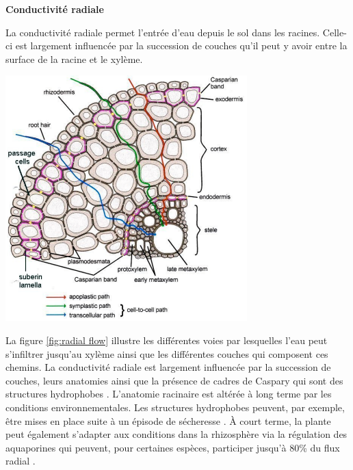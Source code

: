 \noindent \textbf{Conductivité radiale}

La conductivité radiale permet l'entrée d'eau depuis le sol dans les racines.
Celle-ci est largement influencée par la succession de couches qu'il peut y avoir entre la surface de la racine et le xylème.

\begin{minipage}{0.55\linewidth}
\captionsetup{type=figure,hypcap=true}
\centering
\includegraphics[width=\linewidth]{Image/radial flow.png}
\label{fig:radial flow}
\end{minipage}\hfill
\begin{minipage}{0.4\linewidth}
La figure \ref{fig:radial flow} illustre les différentes voies par lesquelles l'eau peut s'infiltrer jusqu'au xylème ainsi que les différentes couches qui composent ces chemins.
La conductivité radiale est largement influencée par la succession de couches, leurs anatomies ainsi que la présence de cadres de Caspary qui sont des structures hydrophobes \citep{yang_drought-induced_2012}.
L'anatomie racinaire est altérée à long terme par les conditions environnementales.
Les structures hydrophobes peuvent, par exemple, être mises en place suite à un épisode de sécheresse \citep{vandeleur_role_2009}.
À court terme, la plante peut également s'adapter aux conditions dans la rhizosphère via la régulation des aquaporines qui peuvent, pour certaines espèces, participer jusqu'à 80\% du flux radial \citep{javot_role_2003}.
\end{minipage} 
\newline

